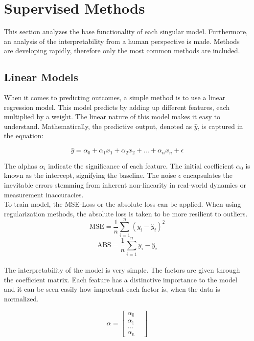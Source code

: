 \section{Supervised Methods}

This section analyzes the base functionality of each singular model. Furthermore, an analysis of the interpretability from a human perspective is made. Methods are developing rapidly, therefore only the most common methods are included.

\subsection{Linear Models}
When it comes to predicting outcomes, a simple method is to use a linear regression model. This model predicts by adding up different features, each multiplied by a weight. The linear nature of this model makes it easy to understand. Mathematically, the predictive output, denoted as $\hat{y}$, is  captured in the equation:

$$ \hat{y}= \alpha_0 + \alpha_1 x_1 + \alpha_2 x_2 +... +\alpha_n x_{n} + \epsilon$$

The alphas $\alpha_i$ indicate the significance of each feature. The initial coefficient $\alpha_0$ is known as the intercept, signifying the baseline.  The noise $\epsilon$ encapsulates the inevitable errors stemming from inherent non-linearity in real-world dynamics or measurement inaccuracies.
\\
To train model, the MSE-Loss or the absolute loss can be applied. When using regularization methods, the absolute loss is taken to be more resilient to outliers.
$$ \text{MSE} = \frac{1}{n} \sum_{i=1}^{n} (y_i - \hat{y}_i)^2$$
$$ \text{ABS} = \frac{1}{n} \sum_{i=1}^{n} y_i - \hat{y}_i$$
\\
The interpretability of the model is very simple. The factors are given through the coefficient matrix. Each feature has a distinctive importance to the model and it can be seen easily how important each factor is, when the data is normalized. 

$$ \alpha = \begin{bmatrix}
	\alpha_0 & \\
	\alpha_1 & \\
	... & \\
	\alpha_n &
\end{bmatrix}
$$

